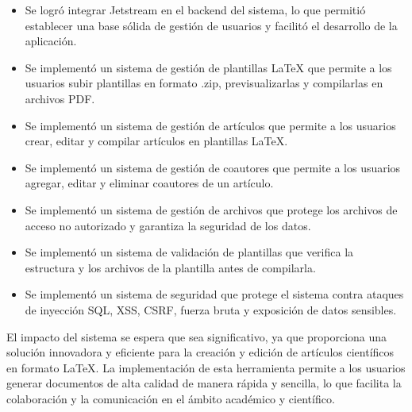 \begin{itemize}
    \item Se logró integrar Jetstream en el backend del sistema, lo que permitió establecer una base sólida de gestión de usuarios y facilitó el desarrollo de la aplicación.
    \item Se implementó un sistema de gestión de plantillas LaTeX que permite a los usuarios subir plantillas en formato .zip, previsualizarlas y compilarlas en archivos PDF.
    \item Se implementó un sistema de gestión de artículos que permite a los usuarios crear, editar y compilar artículos en plantillas LaTeX.
    \item Se implementó un sistema de gestión de coautores que permite a los usuarios agregar, editar y eliminar coautores de un artículo.
    \item Se implementó un sistema de gestión de archivos que protege los archivos de acceso no autorizado y garantiza la seguridad de los datos.
    \item Se implementó un sistema de validación de plantillas que verifica la estructura y los archivos de la plantilla antes de compilarla.
    \item Se implementó un sistema de seguridad que protege el sistema contra ataques de inyección SQL, XSS, CSRF, fuerza bruta y exposición de datos sensibles.
\end{itemize}   

El impacto del sistema se espera que sea significativo, ya que proporciona una solución innovadora y eficiente para la creación y edición de artículos científicos en formato LaTeX. La implementación de esta herramienta permite a los usuarios generar documentos de alta calidad de manera rápida y sencilla, lo que facilita la colaboración y la comunicación en el ámbito académico y científico. 

